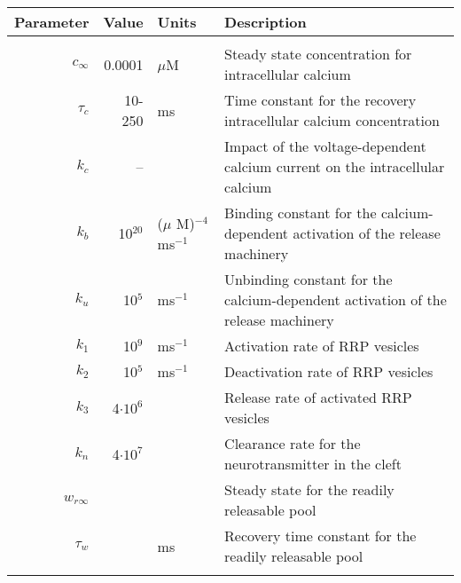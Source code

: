 \begin{appendix}
\begin{table}
\begin{tabular}{r r l p{}}
Parameter & Value & Units & Description \\
\hline &&&\\
$c_{\infty}$ & 0.0001 & $\mu$M & Steady state concentration for intracellular calcium \citep{barroso2015diverse}\\
$\tau_{c}$ & 10-250 & ms & Time constant for the recovery intracellular calcium concentration \citep{barroso2015diverse} \\
$ k_{c}$ & --  &  & Impact of the voltage-dependent calcium current on the intracellular calcium \citep{barroso2015diverse} \\
$k_{b}$ & 10$^{20}$ & ($\mu$ M)$^{-4}$ ms$^{-1}$& Binding constant for the calcium-dependent activation of the release machinery \citep{DestexheMainenSejnowski1994b}\\
$k_{u}$ & 10$^{5}$ & ms$^{-1}$ & Unbinding constant for the calcium-dependent activation of the release machinery \citep{DestexheMainenSejnowski1994b}\\
$k_{1}$ & 10$^{9}$ & ms$^{-1}$ & Activation rate of RRP vesicles \citep{DestexheMainenSejnowski1994b}\\
$k_{2}$ & 10$^{5}$ & ms$^{-1}$ & Deactivation rate of RRP vesicles \citep{DestexheMainenSejnowski1994b}\\
$k_{3} $ & 4$\cdot 10^{6}$&  & Release rate of activated RRP vesicles  \\
$k_{n} $ & 4$\cdot 10^{7}$&  & Clearance rate for the neurotransmitter in the cleft \citep{DestexheMainenSejnowski1994b} \\
$w_{r\infty}$ &  &  & Steady state for the readily releasable pool \citep{barroso2015diverse} \\
$\tau_{w}$ & & ms  & Recovery time constant for the readily releasable pool \citep{barroso2015diverse} \\
\hline &&&\\
\end{tabular}
\end{table}


\end{appendix}
